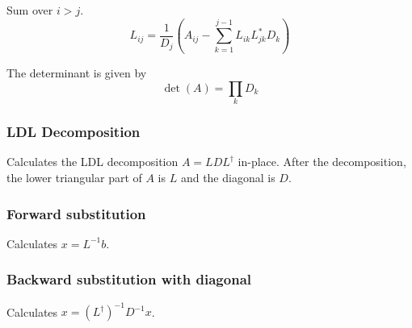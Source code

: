 \documentclass[12pt]{article}
\begin{document}
Sum over $i>j$.
\begin{equation}
 L_{ij} = \frac{1}{D_j}\left(A_{ij}-\sum_{k=1}^{j-1}L_{ik}L_{jk}^*D_k\right)
\end{equation}

The determinant is given by
\begin{equation}
 \det(A) = \prod_k D_k
\end{equation}

\subsubsection*{LDL Decomposition}
Calculates the LDL decomposition $A=LDL^\dagger$ in-place. After the decomposition, the lower triangular part of $A$ is $L$ and the diagonal is $D$.
\begin{center}
\end{center}

\subsubsection*{Forward substitution}
Calculates $x=L^{-1}b$.
\begin{center}
\end{center}

\subsubsection*{Backward substitution with diagonal}
Calculates $x=(L^\dagger)^{-1}D^{-1}x$.
\begin{center}
\end{center}
\end{document}
